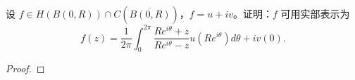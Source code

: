 \documentclass[../../main.tex]{subfiles}
\begin{document}
\begin{theorem}[Schwarz积分公式]\label{theorem:Schwarz积分公式}
设 \( f \in H(B(0,R)) \cap C(\overline{B(0,R)}) \)，\( f = u + iv \)。证明：\( f \) 可用实部表示为
\[
f(z) = \frac{1}{2\pi} \int_{0}^{2\pi} \frac{Re^{i\theta} + z}{Re^{i\theta} - z} u(Re^{i\theta}) d\theta + iv(0).
\]
\end{theorem}
\begin{proof}

\end{proof}
\end{document}
